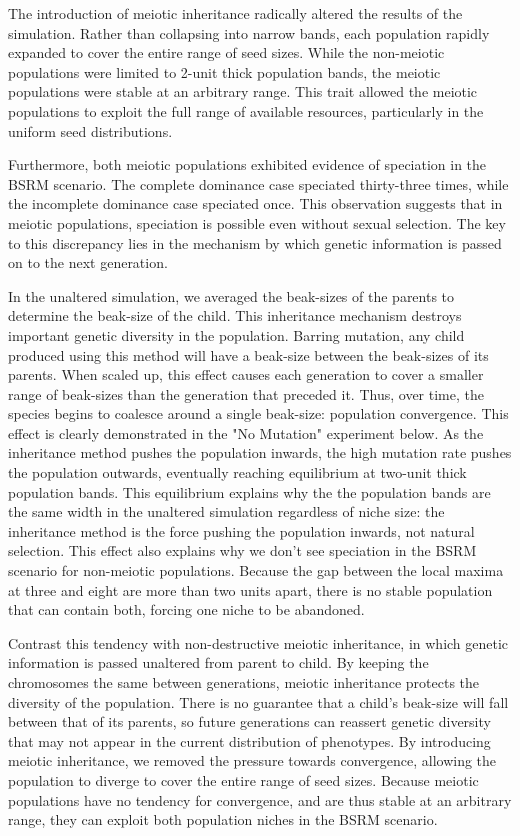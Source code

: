 \documentclass{article}
\begin{document}
The introduction of meiotic inheritance radically altered the results of the simulation. Rather than collapsing into narrow bands, each population rapidly expanded to cover the entire range of seed sizes. While the non-meiotic populations were limited to 2-unit thick population bands, the meiotic populations were stable at an arbitrary range. This trait allowed the meiotic populations to exploit the full range of available resources, particularly in the uniform seed distributions. 

Furthermore, both meiotic populations exhibited evidence of speciation in the BSRM scenario. The complete dominance case speciated thirty-three times, while the incomplete dominance case speciated once. This observation suggests that in meiotic populations, speciation is possible even without sexual selection. The key to this discrepancy lies in the mechanism by which genetic information is passed on to the next generation. 

In the unaltered simulation, we averaged the beak-sizes of the parents to determine the beak-size of the child. This inheritance mechanism destroys important genetic diversity in the population. Barring mutation, any child produced using this method will have a beak-size between the beak-sizes of its parents. When scaled up, this effect causes each generation to cover a smaller range of beak-sizes than the generation that preceded it. Thus, over time, the species begins to coalesce around a single beak-size: population convergence. This effect is clearly demonstrated in the "No Mutation" experiment below. As the inheritance method pushes the population inwards, the high mutation rate pushes the population outwards, eventually reaching equilibrium at two-unit thick population bands. This equilibrium explains why the the population bands are the same width in the unaltered simulation regardless of niche size: the inheritance method is the force pushing the population inwards, not natural selection. This effect also explains why we don’t see speciation in the BSRM scenario for non-meiotic populations. Because the gap between the local maxima at three and eight are more than two units apart, there is no stable population that can contain both, forcing one niche to be abandoned.

Contrast this tendency with non-destructive meiotic inheritance, in which genetic information is passed unaltered from parent to child. By keeping the chromosomes the same between generations, meiotic inheritance protects the diversity of the population. There is no guarantee that a child’s beak-size will fall between that of its parents, so future generations can reassert genetic diversity that may not appear in the current distribution of phenotypes. By introducing meiotic inheritance, we removed the pressure towards convergence, allowing the population to diverge to cover the entire range of seed sizes. Because meiotic populations have no tendency for convergence, and are thus stable at an arbitrary range, they can exploit both population niches in the BSRM scenario.
\end{document}
